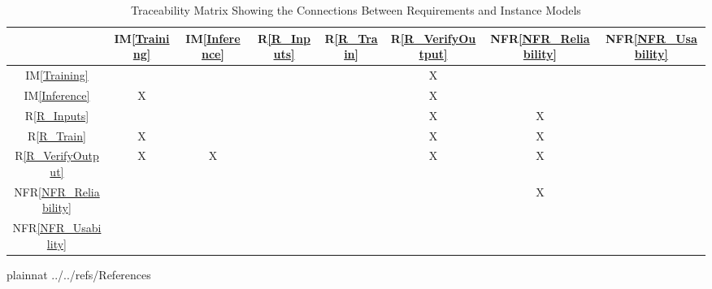 \documentclass[12pt]{article}
\newcommand{\iref}[1]{IM\ref{#1}}
\newcommand{\rref}[1]{R\ref{#1}}
\newcommand{\nfrref}[1]{NFR\ref{#1}}
\begin{document}
\begin{table}[h!]
\centering
\begin{tabular}{|c|c|c|c|c|c|c|c|}
\hline
	& \iref{Training} & \iref{Inference} & \rref{R_Inputs} & \rref{R_Train} & \rref{R_VerifyOutput} & \nfrref{NFR_Reliability} & \nfrref{NFR_Usability} \\
\hline
\iref{Training}            &  &  &  &  & X &  &  \\ \hline
\iref{Inference}           & X &  &  &  & X &  &  \\ \hline
\rref{R_Inputs}            &  &  &  &  & X & X &   \\ \hline
\rref{R_Train}             & X &  &  &  & X & X &    \\ \hline
\rref{R_VerifyOutput}      & X & X &  &  & X & X &    \\ \hline
\nfrref{NFR_Reliability}      &  &  &  &  &  & X &    \\ \hline 
\nfrref{NFR_Usability}     &  &  &  &  &  &  &    \\ \hline
\end{tabular}

\caption{Traceability Matrix Showing the Connections Between Requirements and Instance Models}
\label{Table:R_trace}
\end{table}






\newpage

 {plainnat}
 {../../refs/References}
%





%
%

%
%
\end{document}
